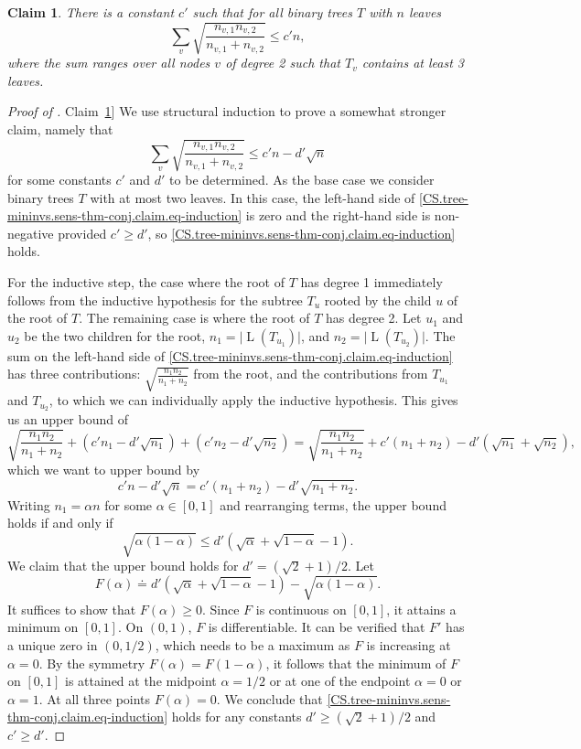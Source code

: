 \documentclass[11pt]{article}
\numberwithin{equation}{section}
\newtheorem{claim}[theorem]{Claim}
\theoremstyle{definition}
\theoremstyle{plain}
\newcommand{\expref}[2]{\hyperref[#2]{#1~\ref{#2}}}
\DeclareMathOperator{\leafset}{L}
\begin{document}
\begin{claim}
    \label{claim:sensitivity:sum}
    There is a constant $c'$ such that for all binary trees $T$ with $n$ leaves 
    \begin{equation}
      \sum_v \sqrt{\frac{n_{v,1}n_{v,2}}{n_{v,1}+n_{v,2}}} \le c'n,
    \end{equation}
    where the sum ranges over all nodes $v$ of degree 2 such that $T_v$ contains at least 3 leaves.
  \end{claim}
\begin{proof}[Proof of \expref{Claim}{claim:sensitivity:sum}]
We use structural induction to prove a somewhat stronger claim, namely that
\begin{equation}\label{CS.tree-mininvs.sens-thm-conj.claim.eq-induction}
  \sum_v \sqrt{\frac{n_{v,1}n_{v,2}}{n_{v,1}+n_{v,2}}} \le c' n - d' \sqrt{n}
\end{equation}
for some constants $c'$ and $d'$ to be determined.
As the base case we consider binary trees $T$ with at most two leaves. In this case, the left-hand side of \eqref{CS.tree-mininvs.sens-thm-conj.claim.eq-induction} is zero and the right-hand side is non-negative provided $c' \ge d'$, so \eqref{CS.tree-mininvs.sens-thm-conj.claim.eq-induction} holds. 

For the inductive step, the case where the root of $T$ has degree 1 immediately follows from the inductive hypothesis for the subtree $T_u$ rooted by the child $u$ of the root of $T$. The remaining case is where the root of $T$ has degree 2. Let $u_1$ and $u_2$ be the two children for the root, $n_1 = \lvert\leafset(T_{u_1})\rvert$, and 
$n_2 = \lvert\leafset(T_{u_2})\rvert$. The sum on the left-hand side of \eqref{CS.tree-mininvs.sens-thm-conj.claim.eq-induction} has three contributions: $\sqrt{\frac{n_1 n_2}{n_1+n_2}}$ from the root, and the contributions from $T_{u_1}$ and $T_{u_2}$, to which we can individually apply the inductive hypothesis. This gives us an upper bound of
\[ \sqrt{\frac{n_1 n_2}{n_1+n_2}} + (c' n_1 - d' \sqrt{n_1}) + (c' n_2 - d' \sqrt{n_2})
=  \sqrt{\frac{n_1 n_2}{n_1+n_2}} + c' (n_1 + n_2) - d' (\sqrt{n_1} + \sqrt{n_2}), \]
which we want to upper bound by
\[ c' n - d' \sqrt{n} = c' (n_1 + n_2) - d' \sqrt{n_1+n_2}. \]
Writing $n_1 = \alpha n$ for some $\alpha \in [0,1]$ and rearranging terms, the upper bound holds if and only if
\[ \sqrt{\alpha(1-\alpha)} \le d' (\sqrt{\alpha} + \sqrt{1-\alpha} -1). \]
We claim that the upper bound holds for $d'= (\sqrt{2}+1)/2$. Let 
\[F(\alpha) \doteq d'(\sqrt{\alpha}+\sqrt{1-\alpha}-1)-\sqrt{\alpha(1-\alpha)}.\]
It suffices to show that $F(\alpha)\ge 0$. Since $F$ is continuous on $[0,1]$, it attains a minimum on $[0,1]$. On $(0,1)$, $F$ is differentiable. It can be verified that $F'$ has a unique zero in $(0,1/2)$, which needs to be a maximum as $F$ is increasing at $\alpha=0$. By the symmetry $F(\alpha)=F(1-\alpha)$, it follows that the minimum of $F$ on $[0,1]$ is attained at the midpoint $\alpha=1/2$ or at one of the endpoint $\alpha=0$ or $\alpha=1$. At all three points $F(\alpha)=0$. 
We conclude that \eqref{CS.tree-mininvs.sens-thm-conj.claim.eq-induction} holds for any constants $d' \ge (\sqrt{2}+1)/2$ and $c' \ge d'$.
\end{proof}
\end{document}
